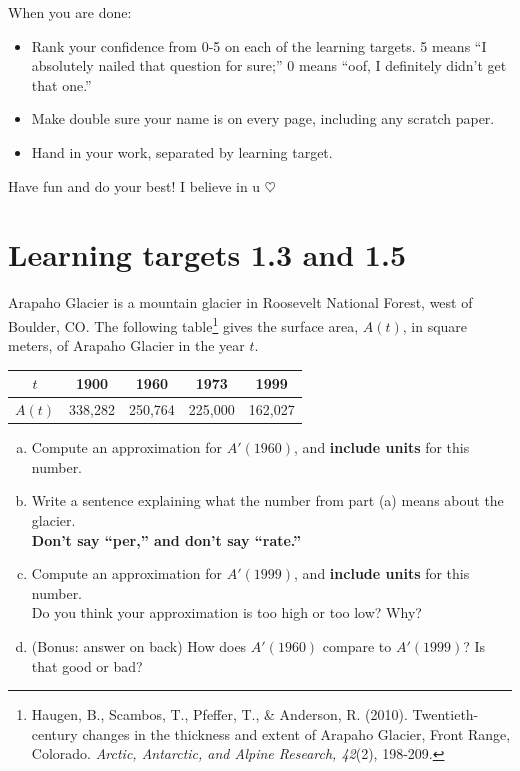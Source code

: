 When you are done:
\begin{itemize}
    \item Rank your confidence from 0-5 on each of the learning targets. 5 means ``I absolutely nailed that question for sure;'' 0 means ``oof, I definitely didn't get that one.''
    \item Make double sure your name is on every page, including any scratch paper.
    \item Hand in your work, separated by learning target.
\end{itemize}

Have fun and do your best! I believe in u $\heartsuit$

\pagebreak

\section{Learning targets 1.3 and 1.5}%

Arapaho Glacier is a mountain glacier in Roosevelt National Forest,
west of Boulder, CO. The following table\footnote{
Haugen, B., Scambos, T., Pfeffer, T., \& Anderson, R. (2010). Twentieth-century changes in the thickness and extent of Arapaho Glacier, Front Range, Colorado. \textit{Arctic, Antarctic, and Alpine Research, 42}(2), 198-209.}
gives the surface area, $A(t)$, in square meters, of Arapaho Glacier in the year $t$. 
\begin{center}
	\begin{tabular}{|c|c|c|c|c|}
	\hline
	$t$ & 1900 & 1960 & 1973 & 1999\\
	\hline
	$A(t)$ & 338,282 & 250,764 & 225,000 & 162,027\\
	\hline
	\end{tabular}
 \end{center}
	
\begin{enumerate}[(a), leftmargin=0pt]

\item Compute an approximation for $A'(1960)$, and {\bf include units} for this number.
\vfill
\vfill

\item Write a sentence explaining what the number from part (a) means about the glacier.\\
\textbf{Don't say ``per,'' and don't say ``rate.''}

\vfill
\vfill

\item Compute an approximation for $A'(1999)$, and {\bf include units} for this number.\\
Do you think your approximation is too high or too low? Why?

\vfill
\vfill

\item (Bonus: answer on back) How does $A'(1960)$ compare to $A'(1999)$? Is that good or bad?
\end{enumerate}

